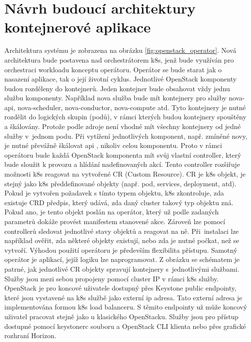 \section{Návrh budoucí architektury kontejnerové aplikace}
Architektura systému je zobrazena na obrázku \ref{fig:openstack_operator}. Nová architektura bude postavena nad orchestrátorem k8s, jenž bude využíván pro orchestraci workloadu konceptu operátoru. Operátor se bude starat jak o nasazení aplikace, tak o její životní cyklus. Jednotlivé OpenStack komponenty budou rozděleny do kontejnerů. Jeden kontejner bude obsahovat vždy jednu službu komponenty. Například nova služba bude mít kontejnery pro služby nova-api, nova-scheduler, nova-conductor, nova-compute atd. Tyto kontejnery je nutné rozdělit do logických skupin (podů), v rámci kterých budou kontejnery spouštěny a škálovány. Protože podle zdroje \cite{k8s_devs} není vhodné mít všechny kontejnery od jedné služby v jednom podu. Při vytížení jednotlivých komponent, např. zmíněné novy, je nutné převážně škálovat api \cite{nova_scale}, nikoliv celou komponentu. Proto v rámci operátoru bude každá OpenStack komponenta mít svůj vlastní controller, který bude sloužit k provozu a hlídání nadefinovaných akcí. Tento controller rozšiřuje možnosti k8s reagovat na vytvořené CR (Custom Resource). CR je k8s objekt, je stejný jako k8s předdefinované objekty (např. pod, services, deployment, atd). Pokud je vytvořen požadavek s tímto typem objektu, k8s zkontroluje, zda existuje CRD předpis, který udává, zda daný cluster takový typ objektu zná. Pokud ano, je tento objekt poslán na operátor, který už podle zadaných parametrů dokáže provést manifestem stanovené akce. Zároveň lze pomocí controllerů sledovat jednotlivé stavy objektů a reagovat na ně. Při instalaci lze například ověřit, zda některé objekty existují, nebo zda je nutné počkat, než se vytvoří. Výhodou použití operátoru je především flexibilita přístupu. Samotný operátor je aplikací, jejíž logiku lze naprogramovat. Z obrázku se schématem je patrné, jak jednotlivé CR objekty spravují kontejnery s jednotlivými službami. Služby jsou mezi sebou propojeny pomocí cluster IP v rámci k8s služby. OpenStack je pro koncové uživatele dostupný přes Keystone public endpointy, které jsou vystavené na k8s službě jako externí ip adresa. Tato externí adresa je implementována formou k8s load balanceru. S těmito endpointy už může koncový uživatel pracovat stejně jako u klasického OpenStacku. Služby jsou pro přístup dostupné pomocí keystonerc souboru a OpenStack CLI klienta nebo přes grafické rozhraní Horizon.

